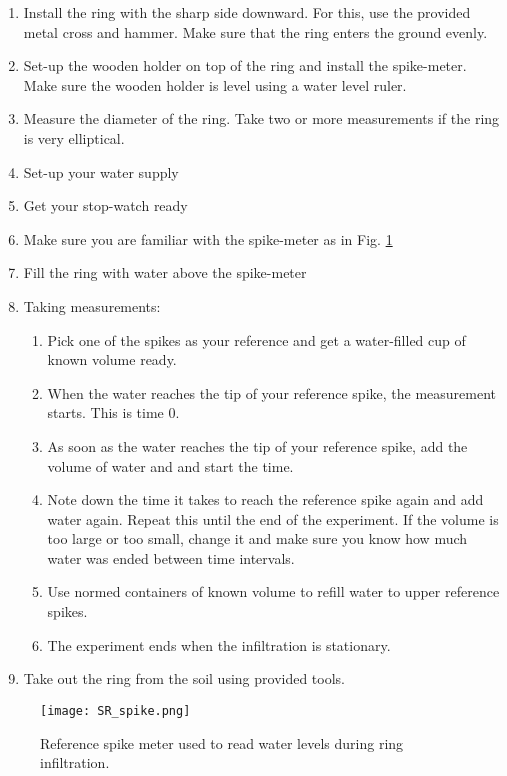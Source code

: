 \documentclass[
10pt, %
a4paper, %
oneside, %
headinclude,footinclude, %
BCOR5mm, %
]{scrartcl}
\begin{document}
\begin{enumerate}
	\item Install the ring with the sharp side downward. For this, use the provided metal cross and hammer. Make sure that the ring enters the ground evenly.  
	\item Set-up the wooden holder on top of the ring and install the spike-meter. Make sure the wooden holder is level using a water level ruler. 
	\item Measure the diameter of the ring. Take two or more measurements if the ring is very elliptical.
	\item Set-up your water supply 
	\item Get your stop-watch ready
	\item Make sure you are familiar with the spike-meter as in Fig. \ref{spike}
	\item Fill the ring with water above the spike-meter
	\item Taking measurements:
	\begin{enumerate}
		\item Pick one of the spikes as your reference and get a water-filled cup of known volume ready.
		\item When the water reaches the tip of your reference spike, the measurement starts. This is time 0. 
		\item As soon as the water reaches the tip of your reference spike, add the volume of water and and start the time.
		\item Note down the time it takes to reach the reference spike again and add water again. Repeat this until the end of the experiment. If the volume is too large or too small, change it and make sure you know how much water was ended between time intervals.
		\item Use normed containers of known volume to refill water to upper reference spikes.
		\item The experiment ends when the infiltration is stationary.
	\end{enumerate}
	\item Take out the ring from the soil using provided tools.
\end{enumerate}

\begin{figure}[!h]
	\centering
	\texttt{[image: SR\_spike.png]}
	\caption{\label{spike}Reference spike meter used to read water levels during ring infiltration.}
\end{figure}
\end{document}
